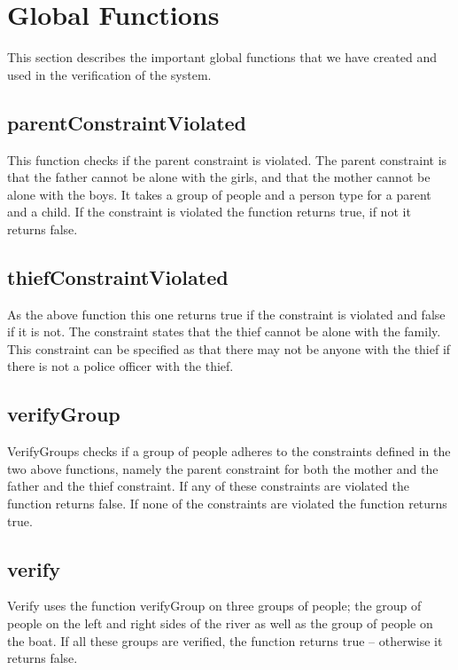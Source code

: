 \section{Global Functions}
\label{globalfunctions}
This section describes the important global functions that we have created and used in the verification of the system.

\subsection{parentConstraintViolated}
This function checks if the parent constraint is violated. 
The parent constraint is that the father cannot be alone with the girls, and that the mother cannot be alone with the boys.
It takes a group of people and a person type for a parent and a child.
If the constraint is violated the function returns true, if not it returns false.

\subsection{thiefConstraintViolated}
As the above function this one returns true if the constraint is violated and false if it is not.
The constraint states that the thief cannot be alone with the family.
This constraint can be specified as that there may not be anyone with the thief if there is not a police officer with the thief.

\subsection{verifyGroup}
VerifyGroups checks if a group of people adheres to the constraints defined in the two above functions, namely the parent constraint for both the mother and the father and the thief constraint.
If any of these constraints are violated the function returns false.
If none of the constraints are violated the function returns true.

\subsection{verify}
\label{global:verify}
Verify uses the function verifyGroup on three groups of people; the group of people on the left and right sides of the river as well as the group of people on the boat.
If all these groups are verified, the function returns true -- otherwise it returns false.